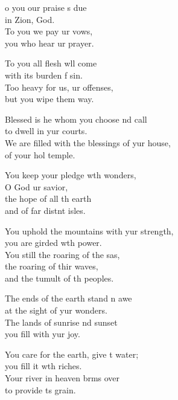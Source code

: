 \begin{psalmverse}
  \begin{patverse}
    o you our praise \pointup{\i}s due\Med\\
in Zion,  God.\\
To you we pay ur vows,\Med\\
you who hear ur prayer.

To you all flesh w\pointup{\i}ll come\Med\\
with its burden f sin.\\
Too heavy for us, ur offenses,\Med\\
but you wipe them way.

Blessed is he whom you choose nd call\Med\\
to dwell in yur courts.\\
We are filled with the blessings of yur house,\Med\\
of your hol temple.

You keep your pledge w\pointup{\i}th wonders,\Med\\
O God ur savior,\\
the hope of all th earth\Med\\
and of far distnt isles.

You uphold the mountains with yur strength,\Med\\
you are girded w\pointup{\i}th power.\\
You still the roaring of the sas,\Flex\\
the roaring of thir waves,\Med\\
and the tumult of th peoples.

The ends of the earth stand \pointup{\i}n awe\Med\\
at the sight of yur wonders.\\
The lands of sunrise nd sunset\Med\\
you fill with yur joy.

You care for the earth, give \pointup{\i}t water;\Med\\
you fill it w\pointup{\i}th riches.\\
Your river in heaven br\pointup{\i}ms over\Med\\
to provide \pointup{\i}ts grain.


\end{patverse}
\end{psalmverse}
